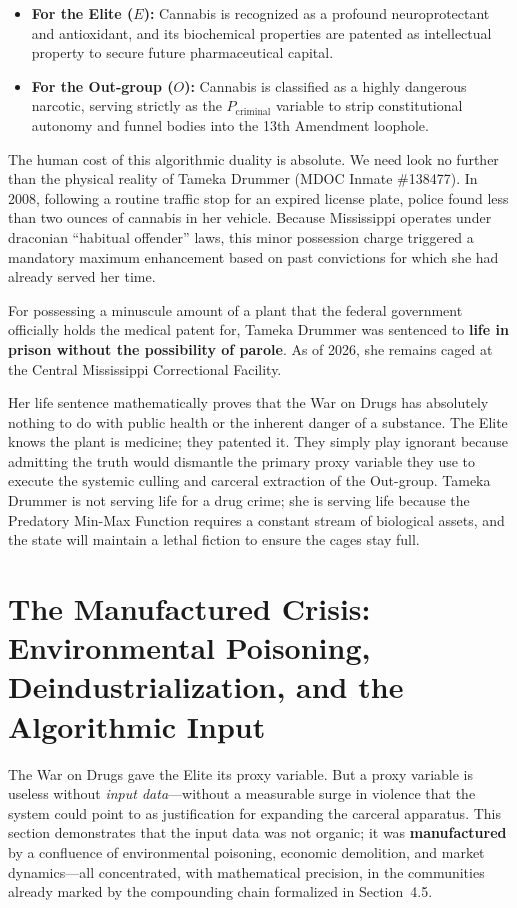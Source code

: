 \documentclass[12pt,openany]{book}
\begin{document}
\begin{itemize}
    \item \textbf{For the Elite ($E$):} Cannabis is recognized as a profound neuroprotectant and antioxidant, and its biochemical properties are patented as intellectual property to secure future pharmaceutical capital.

    \item \textbf{For the Out-group ($O$):} Cannabis is classified as a highly dangerous narcotic, serving strictly as the $P_{\text{criminal}}$ variable to strip constitutional autonomy and funnel bodies into the 13th Amendment loophole.
\end{itemize}

The human cost of this algorithmic duality is absolute. We need look no further than the physical reality of Tameka Drummer (MDOC Inmate \#138477). In 2008, following a routine traffic stop for an expired license plate, police found less than two ounces of cannabis in her vehicle. Because Mississippi operates under draconian ``habitual offender'' laws, this minor possession charge triggered a mandatory maximum enhancement based on past convictions for which she had already served her time.

For possessing a minuscule amount of a plant that the federal government officially holds the medical patent for, Tameka Drummer was sentenced to \textbf{life in prison without the possibility of parole}. As of 2026, she remains caged at the Central Mississippi Correctional Facility.

Her life sentence mathematically proves that the War on Drugs has absolutely nothing to do with public health or the inherent danger of a substance. The Elite knows the plant is medicine; they patented it. They simply play ignorant because admitting the truth would dismantle the primary proxy variable they use to execute the systemic culling and carceral extraction of the Out-group. Tameka Drummer is not serving life for a drug crime; she is serving life because the Predatory Min-Max Function requires a constant stream of biological assets, and the state will maintain a lethal fiction to ensure the cages stay full.

\section{The Manufactured Crisis: Environmental Poisoning, Deindustrialization, and the Algorithmic Input}

The War on Drugs gave the Elite its proxy variable. But a proxy variable is useless without \textit{input data}---without a measurable surge in violence that the system could point to as justification for expanding the carceral apparatus. This section demonstrates that the input data was not organic; it was \textbf{manufactured} by a confluence of environmental poisoning, economic demolition, and market dynamics---all concentrated, with mathematical precision, in the communities already marked by the compounding chain formalized in Section~4.5.
\end{document}
